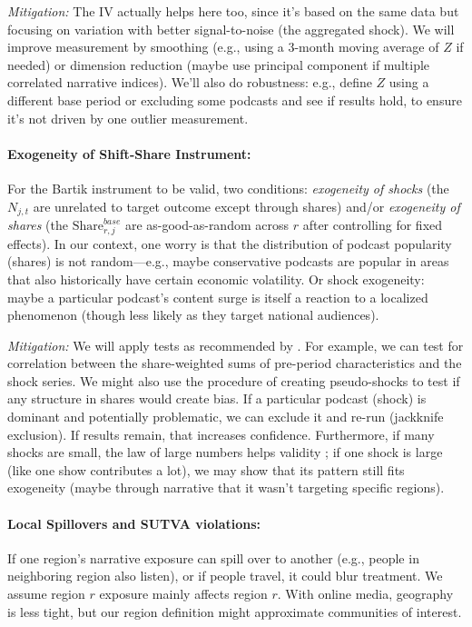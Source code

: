 \documentclass[12pt]{article}
\begin{document}
\textit{Mitigation:} The IV actually helps here too, since it's based on the same data but focusing on variation with better signal-to-noise (the aggregated shock). We will improve measurement by smoothing (e.g., using a 3-month moving average of $Z$ if needed) or dimension reduction (maybe use principal component if multiple correlated narrative indices). We'll also do robustness: e.g., define $Z$ using a different base period or excluding some podcasts and see if results hold, to ensure it's not driven by one outlier measurement.

\paragraph{Exogeneity of Shift-Share Instrument:} For the Bartik instrument to be valid, two conditions: \textit{exogeneity of shocks} (the $N_{j,t}$ are unrelated to target outcome except through shares) and/or \textit{exogeneity of shares} (the $\text{Share}_{r,j}^{base}$ are as-good-as-random across $r$ after controlling for fixed effects). In our context, one worry is that the distribution of podcast popularity (shares) is not random—e.g., maybe conservative podcasts are popular in areas that also historically have certain economic volatility. Or shock exogeneity: maybe a particular podcast's content surge is itself a reaction to a localized phenomenon (though less likely as they target national audiences).

\textit{Mitigation:} We will apply tests as recommended by \citet{borusyakhull2025}. For example, we can test for correlation between the share-weighted sums of pre-period characteristics and the shock series. We might also use the procedure of creating pseudo-shocks to test if any structure in shares would create bias. If a particular podcast (shock) is dominant and potentially problematic, we can exclude it and re-run (jackknife exclusion). If results remain, that increases confidence. Furthermore, if many shocks are small, the law of large numbers helps validity \citep{borusyakhull2025}; if one shock is large (like one show contributes a lot), we may show that its pattern still fits exogeneity (maybe through narrative that it wasn't targeting specific regions).

\paragraph{Local Spillovers and SUTVA violations:} If one region's narrative exposure can spill over to another (e.g., people in neighboring region also listen), or if people travel, it could blur treatment. We assume region $r$ exposure mainly affects region $r$. With online media, geography is less tight, but our region definition might approximate communities of interest.
\end{document}
